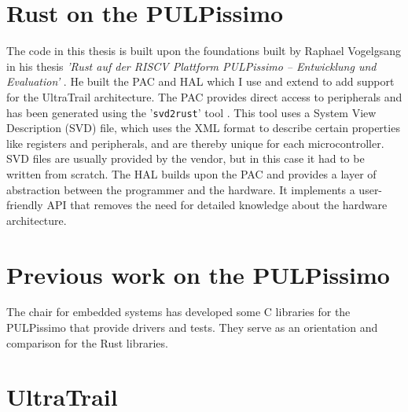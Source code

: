 
\section{Rust on the PULPissimo}

The code in this thesis is built upon the foundations built by Raphael Vogelgsang in his thesis \emph{'Rust auf der RISCV Plattform PULPissimo – Entwicklung und
Evaluation'} \cite{rust_pulp}.
He built the PAC and HAL which I use and extend to add support for the UltraTrail architecture.
The PAC provides direct access to peripherals and has been generated using the '\lstinline{svd2rust}' tool \cite{svd2rust}.
This tool uses a System View Description (SVD) file, which uses the XML format to describe certain properties like registers and peripherals, and are
thereby unique for each microcontroller.
SVD files are usually provided by the vendor, but in this case it had to be written from scratch.
The HAL builds upon the PAC and provides a layer of abstraction between the programmer and the hardware.
It implements a user-friendly API that removes the need for detailed knowledge about the hardware architecture.

\section{Previous work on the PULPissimo}

The chair for embedded systems has developed some C libraries for the PULPissimo that provide drivers and tests.
They serve as an orientation and comparison for the Rust libraries.

\section{UltraTrail}

